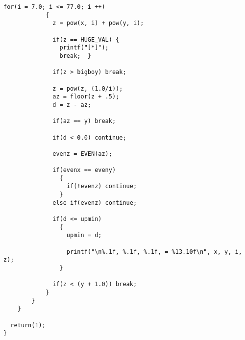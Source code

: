 \begin{appendix}
\begin{lstlisting}[caption={Fermat Near-Miss Finder (Version 2)}, captionpos=b]
          for(i = 7.0; i <= 77.0; i ++)
            {
              z = pow(x, i) + pow(y, i);

              if(z == HUGE_VAL) {
                printf("[*]");
                break;  }

              if(z > bigboy) break;

              z = pow(z, (1.0/i));
              az = floor(z + .5);
              d = z - az;

              if(az == y) break;

              if(d < 0.0) continue;

              evenz = EVEN(az);

              if(evenx == eveny)
                {
                  if(!evenz) continue;
                }
              else if(evenz) continue;

              if(d <= upmin)
                {
                  upmin = d;
                  
                  printf("\n%.1f, %.1f, %.1f, = %13.10f\n", x, y, i, z);
                }
              
              if(z < (y + 1.0)) break;
            }
        }
    }
  
  return(1);
}
\end{lstlisting}

\end{appendix}